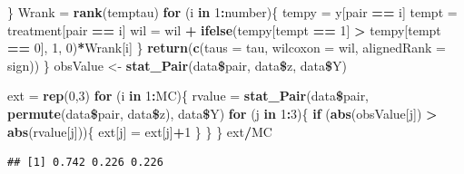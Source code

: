 \documentclass[]{article}
\newenvironment{Shaded}{\begin{snugshade}}{\end{snugshade}}
\newcommand{\KeywordTok}[1]{\textcolor[rgb]{0.13,0.29,0.53}{\textbf{#1}}}
\newcommand{\DataTypeTok}[1]{\textcolor[rgb]{0.13,0.29,0.53}{#1}}
\newcommand{\DecValTok}[1]{\textcolor[rgb]{0.00,0.00,0.81}{#1}}
\newcommand{\StringTok}[1]{\textcolor[rgb]{0.31,0.60,0.02}{#1}}
\newcommand{\ControlFlowTok}[1]{\textcolor[rgb]{0.13,0.29,0.53}{\textbf{#1}}}
\newcommand{\OperatorTok}[1]{\textcolor[rgb]{0.81,0.36,0.00}{\textbf{#1}}}
\newcommand{\NormalTok}[1]{#1}
\begin{document}
\begin{Shaded}
\begin{Highlighting}[]
\NormalTok{  \}}
\NormalTok{  Wrank =}\StringTok{ }\KeywordTok{rank}\NormalTok{(temptau)}
  \ControlFlowTok{for}\NormalTok{ (i }\ControlFlowTok{in} \DecValTok{1}\OperatorTok{:}\NormalTok{number)\{}
\NormalTok{    tempy =}\StringTok{ }\NormalTok{y[pair }\OperatorTok{==}\StringTok{ }\NormalTok{i]}
\NormalTok{    tempt =}\StringTok{ }\NormalTok{treatment[pair }\OperatorTok{==}\StringTok{ }\NormalTok{i]}
\NormalTok{    wil =}\StringTok{ }\NormalTok{wil }\OperatorTok{+}\StringTok{ }\KeywordTok{ifelse}\NormalTok{(tempy[tempt }\OperatorTok{==}\StringTok{ }\DecValTok{1}\NormalTok{] }\OperatorTok{>}\StringTok{ }\NormalTok{tempy[tempt }\OperatorTok{==}\StringTok{ }\DecValTok{0}\NormalTok{], }\DecValTok{1}\NormalTok{, }\DecValTok{0}\NormalTok{)}\OperatorTok{*}\NormalTok{Wrank[i]}
\NormalTok{  \}}
  \KeywordTok{return}\NormalTok{(}\KeywordTok{c}\NormalTok{(}\DataTypeTok{taus =}\NormalTok{ tau, }\DataTypeTok{wilcoxon =}\NormalTok{ wil, }\DataTypeTok{alignedRank =}\NormalTok{ sign))}
\NormalTok{\}}
\NormalTok{obsValue <-}\StringTok{ }\KeywordTok{stat_Pair}\NormalTok{(data}\OperatorTok{\$}\NormalTok{pair, data}\OperatorTok{\$}\NormalTok{z, data}\OperatorTok{\$}\NormalTok{Y)}
\end{Highlighting}
\end{Shaded}

\begin{Shaded}
\begin{Highlighting}[]
\NormalTok{ext =}\StringTok{ }\KeywordTok{rep}\NormalTok{(}\DecValTok{0}\NormalTok{,}\DecValTok{3}\NormalTok{)}
\ControlFlowTok{for}\NormalTok{ (i }\ControlFlowTok{in} \DecValTok{1}\OperatorTok{:}\NormalTok{MC)\{}
\NormalTok{  rvalue =}\StringTok{ }\KeywordTok{stat_Pair}\NormalTok{(data}\OperatorTok{\$}\NormalTok{pair, }\KeywordTok{permute}\NormalTok{(data}\OperatorTok{\$}\NormalTok{pair, data}\OperatorTok{\$}\NormalTok{z), data}\OperatorTok{\$}\NormalTok{Y)}
  \ControlFlowTok{for}\NormalTok{ (j }\ControlFlowTok{in} \DecValTok{1}\OperatorTok{:}\DecValTok{3}\NormalTok{)\{}
    \ControlFlowTok{if}\NormalTok{ (}\KeywordTok{abs}\NormalTok{(obsValue[j]) }\OperatorTok{>}\StringTok{ }\KeywordTok{abs}\NormalTok{(rvalue[j]))\{}
\NormalTok{      ext[j] =}\StringTok{ }\NormalTok{ext[j]}\OperatorTok{+}\DecValTok{1}
\NormalTok{    \}}
\NormalTok{  \}}
\NormalTok{\}}
\NormalTok{ext}\OperatorTok{/}\NormalTok{MC}
\end{Highlighting}
\end{Shaded}

\begin{verbatim}
## [1] 0.742 0.226 0.226
\end{verbatim}
\end{document}

